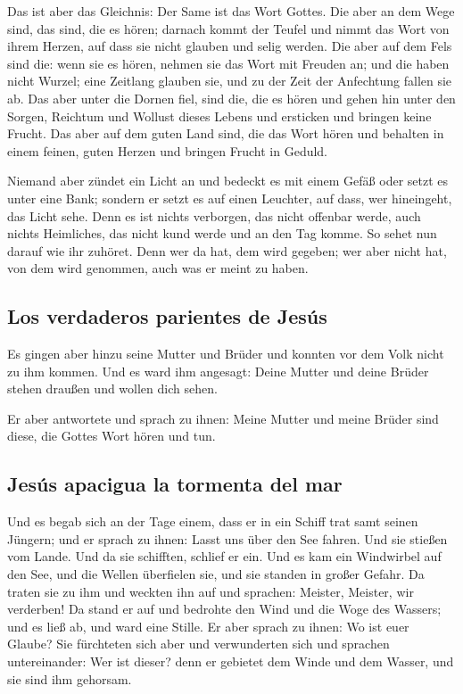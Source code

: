  Das ist aber das Gleichnis: Der Same ist das Wort
Gottes.  Die aber an dem Wege sind, das sind, die es
hören; darnach kommt der Teufel und nimmt das Wort von ihrem Herzen, auf
dass sie nicht glauben und selig werden.  Die aber auf
dem Fels sind die: wenn sie es hören, nehmen sie das Wort mit Freuden
an; und die haben nicht Wurzel; eine Zeitlang glauben sie, und zu der
Zeit der Anfechtung fallen sie ab.  Das aber unter die
Dornen fiel, sind die, die es hören und gehen hin unter den Sorgen,
Reichtum und Wollust dieses Lebens und ersticken und bringen keine
Frucht.  Das aber auf dem guten Land sind, die das Wort
hören und behalten in einem feinen, guten Herzen und bringen Frucht in
Geduld.

 Niemand aber zündet ein Licht an und bedeckt es mit
einem Gefäß oder setzt es unter eine Bank; sondern er setzt es auf einen
Leuchter, auf dass, wer hineingeht, das Licht sehe.  Denn
es ist nichts verborgen, das nicht offenbar werde, auch nichts
Heimliches, das nicht kund werde und an den Tag komme. 
So sehet nun darauf wie ihr zuhöret. Denn wer da hat, dem wird gegeben;
wer aber nicht hat, von dem wird genommen, auch was er meint zu haben.

\hypertarget{los-verdaderos-parientes-de-jesuxfas}{%
\subsection{Los verdaderos parientes de
Jesús}\label{los-verdaderos-parientes-de-jesuxfas}}

 Es gingen aber hinzu seine Mutter und Brüder und konnten
vor dem Volk nicht zu ihm kommen.  Und es ward ihm
angesagt: Deine Mutter und deine Brüder stehen draußen und wollen dich
sehen.

 Er aber antwortete und sprach zu ihnen: Meine Mutter und
meine Brüder sind diese, die Gottes Wort hören und tun.

\hypertarget{jesuxfas-apacigua-la-tormenta-del-mar}{%
\subsection{Jesús apacigua la tormenta del
mar}\label{jesuxfas-apacigua-la-tormenta-del-mar}}

 Und es begab sich an der Tage einem, dass er in ein
Schiff trat samt seinen Jüngern; und er sprach zu ihnen: Lasst uns über
den See fahren. Und sie stießen vom Lande.  Und da sie
schifften, schlief er ein. Und es kam ein Windwirbel auf den See, und
die Wellen überfielen sie, und sie standen in großer Gefahr.
 Da traten sie zu ihm und weckten ihn auf und sprachen:
Meister, Meister, wir verderben! Da stand er auf und bedrohte den Wind
und die Woge des Wassers; und es ließ ab, und ward eine Stille.
 Er aber sprach zu ihnen: Wo ist euer Glaube? Sie
fürchteten sich aber und verwunderten sich und sprachen untereinander:
Wer ist dieser? denn er gebietet dem Winde und dem Wasser, und sie sind
ihm gehorsam.


